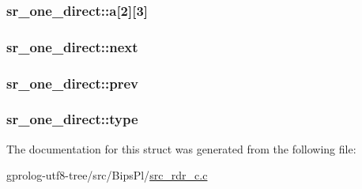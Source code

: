 \subsubsection[{\texorpdfstring{a}{a}}]{ sr\+\_\+one\+\_\+direct\+::a\mbox{[}2\mbox{]}\mbox{[}3\mbox{]}}\hypertarget{structsr__one__direct_abe60646d574e029facc37a9b2491a74b}{}\label{structsr__one__direct_abe60646d574e029facc37a9b2491a74b}
\subsubsection[{\texorpdfstring{next}{next}}]{ sr\+\_\+one\+\_\+direct\+::next}\hypertarget{structsr__one__direct_a601890e68d977d3467e52ab3a7ce9703}{}\label{structsr__one__direct_a601890e68d977d3467e52ab3a7ce9703}
\subsubsection[{\texorpdfstring{prev}{prev}}]{ sr\+\_\+one\+\_\+direct\+::prev}\hypertarget{structsr__one__direct_a25fd2e3df4af8e0f8cb89af0a1ea77f9}{}\label{structsr__one__direct_a25fd2e3df4af8e0f8cb89af0a1ea77f9}
\subsubsection[{\texorpdfstring{type}{type}}]{ sr\+\_\+one\+\_\+direct\+::type}\hypertarget{structsr__one__direct_ac59da886bfa2db8f18de3506965397f7}{}\label{structsr__one__direct_ac59da886bfa2db8f18de3506965397f7}


The documentation for this struct was generated from the following file\+:\begin{DoxyCompactItemize}
\item 
gprolog-\/utf8-\/tree/src/\+Bips\+Pl/\hyperlink{src__rdr__c_8c}{src\+\_\+rdr\+\_\+c.\+c}\end{DoxyCompactItemize}
